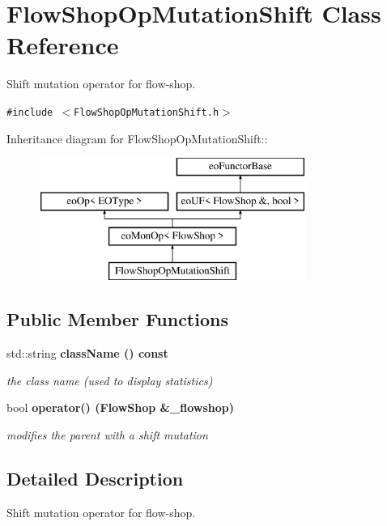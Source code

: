\section{Flow\-Shop\-Op\-Mutation\-Shift Class Reference}
\label{classFlowShopOpMutationShift}
Shift mutation operator for flow-shop.  


{\tt \#include $<$Flow\-Shop\-Op\-Mutation\-Shift.h$>$}

Inheritance diagram for Flow\-Shop\-Op\-Mutation\-Shift::\begin{figure}[H]
\begin{center}
\leavevmode
\includegraphics[height=4cm]{classFlowShopOpMutationShift}
\end{center}
\end{figure}
\subsection*{Public Member Functions}
\begin{CompactItemize}
\item 
std::string \bf{class\-Name} () const \label{classFlowShopOpMutationShift_dd1d710568978d1d4bb8c6f3925da4c6}

\begin{CompactList}\small\item\em the class name (used to display statistics) \item\end{CompactList}\item 
bool \bf{operator()} (\bf{Flow\-Shop} \&\_\-flowshop)
\begin{CompactList}\small\item\em modifies the parent with a shift mutation \item\end{CompactList}\end{CompactItemize}


\subsection{Detailed Description}
Shift mutation operator for flow-shop. 



